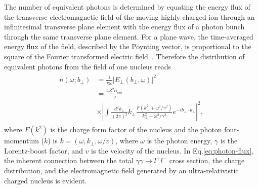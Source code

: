 \documentclass[twocolumn,epjc3]{svjour3}\sloppy
\begin{document}
The number of equivalent photons is determined by equating the energy flux of the transverse electromagnetic field of the moving highly charged ion through an infinitesimal transverse plane element with the energy flux of a photon bunch through the same transverse plane element. For a plane wave, the time-averaged energy flux of the field, described by the Poynting vector, is proportional to the square of the Fourier transformed electric field~\cite{jacksonClassicalElectrodynamics1975}. Therefore the distribution of equivalent photons from the field of one nucleus reads 
\begin{align}
    \begin{split}
    n(\omega; b_\perp) & = \frac{1}{\pi\omega}|E_\perp(b_\perp, \omega)|^2 \\
    & = \frac{4Z^2\alpha_{em}}{\omega} \\
    & \times \left| \int \frac{d^2k_\perp}{(2\pi)^2} k_\perp \frac{F(k^2_\perp +\omega^2/\gamma^2)}{k^2_\perp +\omega^2/\gamma^2} e^{-i b_\perp \cdot k_\perp}  \right|^2,
    \end{split}
    \label{eq:photon-flux}
\end{align}
where $F(k^2)$ is the charge form factor of the nucleus and the photon four-momentum ($k$) is $k = (\omega, k_\perp, \omega/v )$, where $\omega$ is the photon energy, $\gamma$ is the Lorentz-boost factor, and $v$ is the velocity of the nucleus.
In Eq.\ref{eq:photon-flux}, the inherent connection between the total $\gamma\gamma \rightarrow l^+l^-$ cross section, the charge distribution, and the electromagnetic field generated by an ultra-relativistic charged nucleus is evident.
\end{document}
